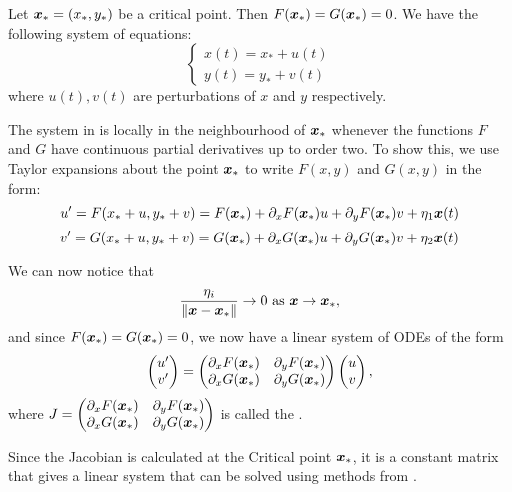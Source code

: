 Let $\bm{x}_{\ast} = (x_{\ast},y_{\ast})$ be a critical point. Then $F(\bm{x}_{\ast}) = G(\bm{x}_{\ast}) = 0$. We have the following system of equations:
\[
\begin{cases}
	x(t) = x_{\ast} + u(t) \\
	y(t) = y_{\ast} + v(t)
\end{cases}
\]
where $u(t), v(t)$ are perturbations of $x$ and $y$ respectively.

The system in  is locally in the neighbourhood of $\bm{x}_{\ast}$ whenever the functions $F$ and $G$ have continuous partial derivatives up to order two. To show this, we use Taylor expansions about the point $\bm{x}_{\ast}$ to write $F(x, y)$ and $G(x, y)$ in the form:
\[ 
u' = F(x_{\ast} + u, y_{\ast} + v) = F(\bm{x}_{\ast}) + \partial_x F(\bm{x}_{\ast})u + \partial_y F(\bm{x}_{\ast})v + \eta_1 \bm{x}(t) \]
\[
v' = G(x_{\ast} + u, y_{\ast} + v) = G(\bm{x}_{\ast}) + \partial_x G(\bm{x}_{\ast})u + \partial_y G(\bm{x}_{\ast})v + \eta_2 \bm{x}(t)
\]

We can now notice that
\[
\frac{\eta_i}{\Vert \bm{x} - \bm{x}_{\ast} \Vert} \rightarrow 0 \text{ as } \bm{x} \rightarrow \bm{x}_{\ast},
\]
and since $F(\bm{x}_{\ast}) = G(\bm{x}_{\ast})=0$, we now have a linear system of ODEs of the form
\begin{equation}\label{3.2}
	\begin{pmatrix}u'\\v'\end{pmatrix} = \begin{pmatrix}\partial_x F(\bm{x}_{\ast}) & \partial_y F(\bm{x}_{\ast}) \\ \partial_x G(\bm{x}_{\ast}) & \partial_y G(\bm{x}_{\ast})\end{pmatrix} \begin{pmatrix}u\\v\end{pmatrix},
\end{equation}
where $J = \begin{pmatrix}\partial_x F(\bm{x}_{\ast}) & \partial_y F(\bm{x}_{\ast}) \\ \partial_x G(\bm{x}_{\ast}) & \partial_y G(\bm{x}_{\ast})\end{pmatrix}$ is called the .

Since the Jacobian is calculated at the Critical point $\bm{x}_{\ast}$, it is a constant matrix that gives a linear system that can be solved using methods from .

